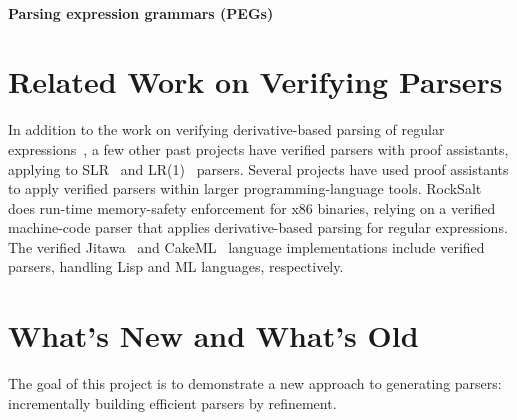           
    \paragraph{Parsing expression grammars (PEGs)} 
    
    
  \section{Related Work on Verifying Parsers}    
    In addition to the work on verifying derivative-based parsing of regular expressions~\cite{DerivsCoq}, a few other past projects have verified parsers with proof assistants, applying to SLR~\cite{SLR} and LR(1)~\cite{LR1} parsers.  Several projects have used proof assistants to apply verified parsers within larger programming-language tools.  RockSalt~\cite{RockSalt} does run-time memory-safety enforcement for x86 binaries, relying on a verified machine-code parser that applies derivative-based parsing for regular expressions.  The verified Jitawa~\cite{Jitawa} and CakeML~\cite{CakeML} language implementations include verified parsers, handling Lisp and ML languages, respectively.
    
\section{What's New and What's Old} \label{sec:new} \label{sec:goals}
  The goal of this project is to demonstrate a new approach to generating parsers: incrementally building efficient parsers by refinement.
  
